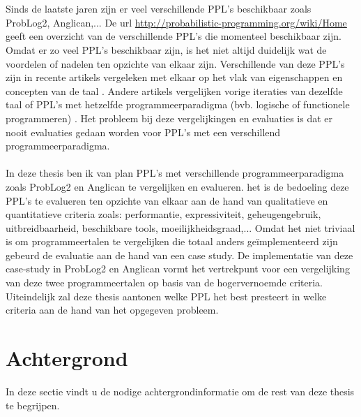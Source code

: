 \documentclass[12pt,a4paper,oneside]{book}
\theoremstyle{definition}
\begin{document}
\\\\
Sinds de laatste jaren zijn er veel verschillende PPL's beschikbaar zoals ProbLog2, Anglican,... De url \url{http://probabilistic-programming.org/wiki/Home} geeft een overzicht van de verschillende PPL's die momenteel beschikbaar zijn.
Omdat er zo veel PPL's beschikbaar zijn, is het niet altijd duidelijk wat de voordelen of nadelen ten opzichte van elkaar zijn. Verschillende van deze PPL's zijn in recente artikels vergeleken met elkaar op het vlak van eigenschappen en concepten van de taal \cite{plpconcepts}. Andere artikels vergelijken vorige iteraties van dezelfde taal of PPL's met hetzelfde programmeerparadigma (bvb. logische of functionele programmeren) \cite{plpinferencelearningwbf}. Het probleem bij deze vergelijkingen en evaluaties is dat er nooit evaluaties gedaan worden voor PPL's met een verschillend programmeerparadigma.
\\\\
In deze thesis ben ik van plan PPL's met verschillende programmeerparadigma zoals ProbLog2 en Anglican te vergelijken en evalueren. het is de bedoeling deze PPL's te evalueren ten opzichte van elkaar aan de hand van qualitatieve en quantitatieve criteria zoals: performantie, expressiviteit, geheugengebruik, uitbreidbaarheid, beschikbare tools, moeilijkheidsgraad,... Omdat het niet triviaal is om programmeertalen te vergelijken die totaal anders ge\"{i}mplementeerd zijn gebeurd de evaluatie aan de hand van een case study. De implementatie van deze case-study in ProbLog2 en Anglican vormt het vertrekpunt voor een vergelijking van deze twee programmeertalen op basis van de hogervernoemde criteria. Uiteindelijk zal deze thesis aantonen welke PPL het best presteert in welke criteria aan de hand van het opgegeven probleem.

\chapter{Achtergrond}
In deze sectie vindt u de nodige achtergrondinformatie om de rest van deze thesis te begrijpen.
\end{document}
